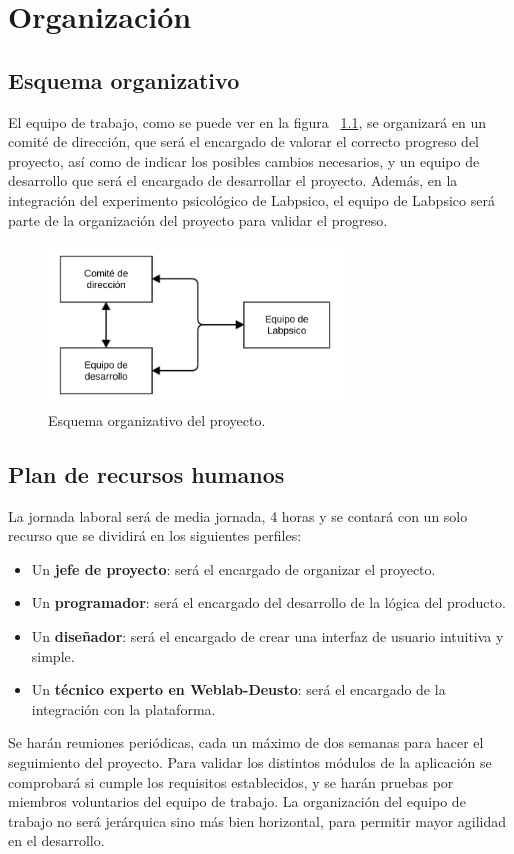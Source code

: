 \chapter{Organización}

\section{Esquema organizativo}

El equipo de trabajo, como se puede ver en la figura ~\ref{fig:org}, se organizará en un comité de
dirección, que será el encargado de valorar el correcto progreso del proyecto, así como de indicar
los posibles cambios necesarios, y un equipo de desarrollo que será el encargado de desarrollar el
proyecto. Además, en la integración del experimento psicológico de Labpsico, el equipo de Labpsico
será parte de la organización del proyecto para validar el progreso.

\begin{figure}[h]
	\centering
	\includegraphics[width=0.7\textwidth]{fig/organizacion}
	\caption{Esquema organizativo del proyecto.}\label{fig:org}
\end{figure}

\section{Plan de recursos humanos}

La jornada laboral será de media jornada, 4 horas y se contará con un solo recurso que se dividirá
en los siguientes perfiles:

\begin{itemize}
\item Un \textbf{jefe de proyecto}: será el encargado de organizar el proyecto.

\item Un \textbf{programador}: será el encargado del desarrollo de la lógica del producto.

\item Un \textbf{diseñador}: será el encargado de crear una interfaz de usuario intuitiva y simple.

\item Un \textbf{técnico experto en Weblab-Deusto}: será el encargado de la integración con la
plataforma.
\end{itemize}

Se harán reuniones periódicas, cada un máximo de dos semanas para hacer el seguimiento del proyecto.
Para validar los distintos módulos de la aplicación se comprobará si cumple los requisitos
establecidos, y se harán pruebas por miembros voluntarios del equipo de trabajo. La organización del
equipo de trabajo no será jerárquica sino más bien horizontal, para permitir mayor agilidad en el
desarrollo.
